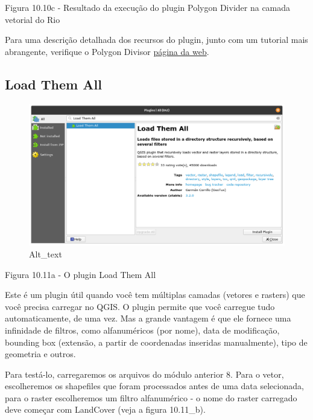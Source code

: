 \documentclass[
  portuguese,
]{krantz}
\begin{document}
Figura 10.10c - Resultado da execução do plugin Polygon Divider na camada vetorial do Rio

Para uma descrição detalhada dos recursos do plugin, junto com um tutorial mais abrangente, verifique o Polygon Divisor \href{https://github.com/jonnyhuck/RFCL-PolygonDivider}{página da web}.

\hypertarget{load-them-all}{%
\subsection{\texorpdfstring{\textbf{Load Them All}}{Load Them All}}\label{load-them-all}}

\begin{figure}
\centering
\includegraphics{media/modulo10/fig1011_a.png}
\caption{Alt\_text}
\end{figure}

Figura 10.11a - O plugin Load Them All

Este é um plugin útil quando você tem múltiplas camadas (vetores e rasters) que você precisa carregar no QGIS. O plugin permite que você carregue tudo automaticamente, de uma vez. Mas a grande vantagem é que ele fornece uma infinidade de filtros, como alfanuméricos (por nome), data de modificação, bounding box (extensão, a partir de coordenadas inseridas manualmente), tipo de geometria e outros.

Para testá-lo, carregaremos os arquivos do módulo anterior 8. Para o vetor, escolheremos os shapefiles que foram processados \hspace{0pt}\hspace{0pt}antes de uma data selecionada, para o raster escolheremos um filtro alfanumérico - o nome do raster carregado deve começar com LandCover (veja a figura 10.11\_b).
\end{document}
